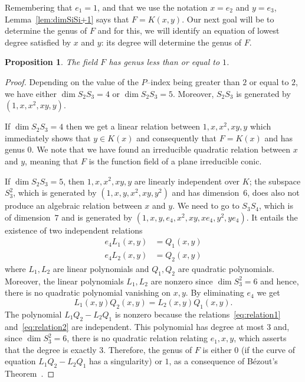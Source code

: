 \documentclass[10pt]{amsart}
\newtheorem{prop}[theo]{Proposition}
\theoremstyle{definition}
\theoremstyle{remark}
\begin{document}
Remembering that $e_1=1$, and that we use the notation $x=e_2$ and $y=e_3$, Lemma~\ref{lem:dimSiSi+1} says that $F=K(x,y)$. Our next goal will be to determine the genus of $F$ and for this, we will identify an equation of lowest degree satisfied by $x$ and $y$: its degree will determine the genus of $F$.

\begin{prop}\label{prop:genus}
The field $F$ has genus less than or equal to $1$.
\end{prop}

\begin{proof}
Depending on the value of the $P$--index being greater than $2$ or equal to $2$, we have either $\dim S_2 S_3=4$ or $\dim S_2 S_3=5$. Moreover, $S_2S_3$ is generated by $(1,x,x^2,xy,y)$.

If $\dim S_2 S_3=4$ then we get a linear relation between $1,x,x^2,xy,y$ which immediately shows that $y\in K(x)$ and consequently that $F=K(x)$ and has genus $0$. We note that we have found an irreducible quadratic relation between $x$ and $y$, meaning that $F$ is the function field of a plane irreducible conic.

If $\dim S_2 S_3=5$, then $1,x,x^2,xy,y$ are linearly independent over $K$; the subspace $S_3^2$, which is generated by $(1, x, y, x^2, x y, y^2)$ and has dimension~$6$, does also not produce an algebraic relation between $x$ and $y$. We need to go to $S_3S_4$, which is of dimension~$7$ and is generated by $(1, x, y, e_4, x^2, x y, x e_4, y^2, y e_4)$. It entails the existence of two independent relations
\begin{align}
e_4 L_1(x,y)&= Q_1(x, y) \label{eq:relation1}\\
e_4 L_2(x,y)&= Q_2(x, y) \label{eq:relation2}
\end{align}
where $L_1, L_2$ are linear polynomials and $Q_1, Q_2$ are quadratic polynomials. Moreover, the linear polynomials $L_1, L_2$ are nonzero since $\dim S_3^2=6$ and hence, there is no quadratic polynomial vanishing on $x, y$. By eliminating $e_4$ we get
\begin{equation}
L_1(x, y) Q_2 (x, y)= L_2(x, y) Q_1(x, y).
\end{equation}
The polynomial $L_1 Q_2 - L_2 Q_1$ is nonzero because the relations~\eqref{eq:relation1} and~\eqref{eq:relation2} are independent. This polynomial has degree at most $3$ and, since $\dim S_3^2=6$, there is no quadratic relation relating $e_1, x, y$, which asserts that the degree is exactly $3$. Therefore, the genus of $F$ is either $0$ (if the curve of equation $L_1 Q_2 - L_2 Q_1$ has a singularity) or $1$, as a consequence of Bézout's Theorem~\cite{Fulton}.
\end{proof}
\end{document}
